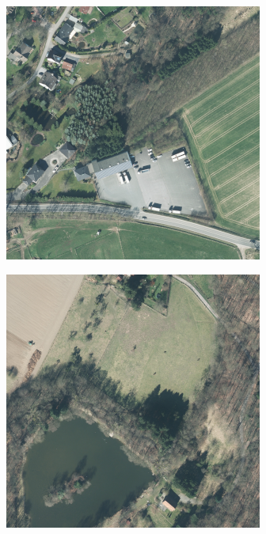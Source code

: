 \begin{figure}
    \newcommand{\DopLabelImageWidth}{0.20\textwidth}
    \centering
    \hfill
    \begin{subfigure}{\DopLabelImageWidth}
        \includegraphics[width=\textwidth]{images/186_image}
    \end{subfigure}
    \hfill
    \begin{subfigure}{\DopLabelImageWidth}
        \includegraphics[width=\textwidth]{images/583_image}

\end{subfigure}
\end{figure}
